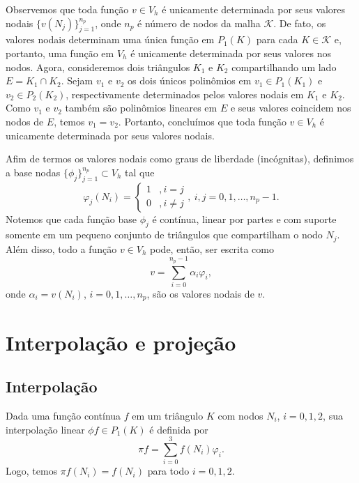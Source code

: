 Observemos que toda função $v\in V_h$ é unicamente determinada por seus valores nodais $\{v(N_j)\}_{j=1}^{n_p}$, onde $n_p$ é número de nodos da malha $\mathcal{K}$. De fato, os valores nodais determinam uma única função em $P_1(K)$ para cada $K\in\mathcal{K}$ e, portanto, uma função em $V_h$ é unicamente determinada por seus valores nos nodos. Agora, consideremos dois triângulos $K_1$ e $K_2$ compartilhando um lado $E = K_1\cap K_2$. Sejam $v_1$ e $v_2$ os dois únicos polinômios em $v_1\in P_1(K_1)$ e $v_2\in P_2(K_2)$, respectivamente determinados pelos valores nodais em $K_1$ e $K_2$. Como $v_1$ e $v_2$ também são polinômios lineares em $E$ e seus valores coincidem nos nodos de $E$, temos $v_1 = v_2$. Portanto, concluímos que toda função $v\in V_h$ é unicamente determinada por seus valores nodais.

Afim de termos os valores nodais como graus de liberdade (incógnitas), definimos a base nodas $\{\phi_j\}_{j=1}^{n_p}\subset V_h$ tal que
\begin{equation}
  \varphi_j(N_i) = \left\{
    \begin{array}{ll}
      1 &, i=j\\
      0 &, i\neq j
    \end{array}
\right.,~i,j=0, 1, \dotsc, n_p-1.
\end{equation}
Notemos que cada função base $\phi_j$ é contínua, linear por partes e com suporte somente em um pequeno conjunto de triângulos que compartilham o nodo $N_j$. Além disso, todo a função $v\in V_h$ pode, então, ser escrita como
\begin{equation}
  v = \sum_{i=0}^{n_p-1}\alpha_i\varphi_i,
\end{equation}
onde $\alpha_i = v(N_i)$, $i=0, 1, \ldots, n_p$, são os valores nodais de $v$.

\section{Interpolação e projeção}

\subsection{Interpolação}

Dada uma função contínua $f$ em um triângulo $K$ com nodos $N_i$, $i=0, 1, 2$, sua interpolação linear $\phi f \in P_1(K)$ é definida por
\begin{equation}
  \pi f = \sum_{i=0}^3 f(N_i)\varphi_i.
\end{equation}
Logo, temos $\pi f(N_i) = f(N_i)$ para todo $i=0, 1, 2$.

